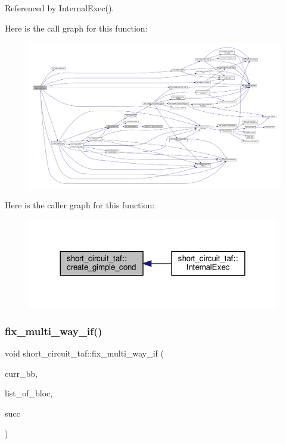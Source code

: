 Referenced by Internal\+Exec().

Here is the call graph for this function\+:
\nopagebreak
\begin{figure}[H]
\begin{center}
\leavevmode
\includegraphics[width=350pt]{dd/d1c/classshort__circuit__taf_ae72320e3a6c9112a5d7fe80414294d46_cgraph}
\end{center}
\end{figure}
Here is the caller graph for this function\+:
\nopagebreak
\begin{figure}[H]
\begin{center}
\leavevmode
\includegraphics[width=312pt]{dd/d1c/classshort__circuit__taf_ae72320e3a6c9112a5d7fe80414294d46_icgraph}
\end{center}
\end{figure}
\mbox{\label{classshort__circuit__taf_a295d6fe0b5076cb8c4b21b0de330677b}} 
\subsubsection{\texorpdfstring{fix\+\_\+multi\+\_\+way\+\_\+if()}{fix\_multi\_way\_if()}}
{\footnotesize\ttfamily void short\+\_\+circuit\+\_\+taf\+::fix\+\_\+multi\+\_\+way\+\_\+if (\begin{DoxyParamCaption}\item[{unsigned int}]{curr\+\_\+bb,  }\item[{std\+::map$<$ unsigned int, bloc\+Ref $>$ \&}]{list\+\_\+of\+\_\+bloc,  }\item[{unsigned int}]{succ }\end{DoxyParamCaption})\hspace{0.3cm}{\ttfamily [private]}}



